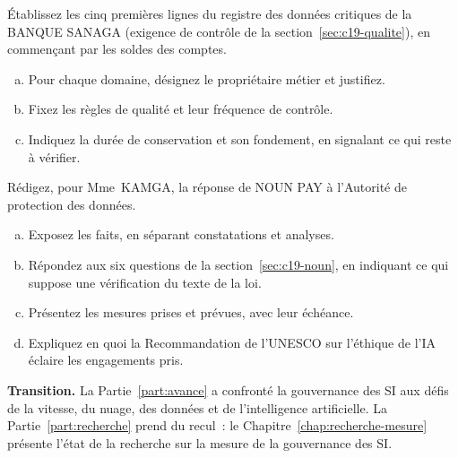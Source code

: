 \begin{boxexo}[title={\ding{45}\quad Exercice~19.2. Le registre des données de la BANQUE SANAGA \niveaumoyen}]
Établissez les cinq premières lignes du registre des données critiques de
la BANQUE SANAGA (exigence de contrôle de la section~\ref{sec:c19-qualite}),
en commençant par les soldes des comptes.
\begin{enumerate}[(a)]
    \item Pour chaque domaine, désignez le propriétaire métier et
          justifiez.
    \item Fixez les règles de qualité et leur fréquence de contrôle.
    \item Indiquez la durée de conservation et son fondement, en signalant
          ce qui reste à vérifier.
\end{enumerate}
\end{boxexo}

\begin{boxexo}[title={\ding{45}\quad Exercice~19.3. La réponse à l'Autorité de protection des données \niveauexpert}]
Rédigez, pour Mme~KAMGA, la réponse de NOUN PAY à l'Autorité de
protection des données.
\begin{enumerate}[(a)]
    \item Exposez les faits, en séparant constatations et analyses.
    \item Répondez aux six questions de la section~\ref{sec:c19-noun}, en
          indiquant ce qui suppose une vérification du texte de la loi.
    \item Présentez les mesures prises et prévues, avec leur échéance.
    \item Expliquez en quoi la Recommandation de l'UNESCO sur l'éthique de
          l'IA éclaire les engagements pris.
\end{enumerate}
\end{boxexo}

\bigskip

\begin{boxinfo}
\textbf{Transition.} La Partie~\ref{part:avance} a confronté la gouvernance
des SI aux défis de la vitesse, du nuage, des données et de
l'intelligence artificielle. La Partie~\ref{part:recherche} prend du
recul~: le Chapitre~\ref{chap:recherche-mesure} présente l'état de la
recherche sur la mesure de la gouvernance des SI.
\end{boxinfo}
